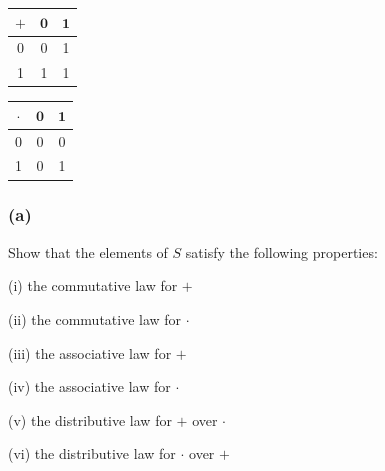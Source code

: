 \documentclass[14pt]{extarticle}
\begin{document}
\begin{center}
\begin{tabular}{c|cc}
\(\bm{+}\) & \(\bm{0}\) & \(\bm{1}\) \\
\hline
0 & 0 & 1 \\
1 & 1 & 1 \\
\end{tabular}
\hspace{2cm}
\begin{tabular}{c|cc}
\(\bm{\cdot}\) & \(\bm{0}\) & \(\bm{1}\) \\
\hline
0 & 0 & 0 \\
1 & 0 & 1 \\
\end{tabular}
\end{center}

\subsubsection{(a)}
Show that the elements of $S$ satisfy the following properties:

(i) the commutative law for $+$

(ii) the commutative law for $\cdot$

(iii) the associative law for $+$

(iv) the associative law for $\cdot$

(v) the distributive law for $+$ over $\cdot$

(vi) the distributive law for $\cdot$ over $+$
\end{document}
